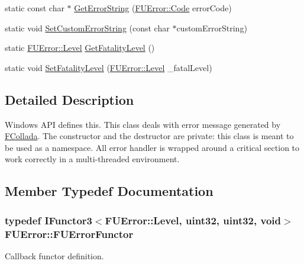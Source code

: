 \begin{DoxyCompactItemize}
\item 
static const char $\ast$ \hyperlink{classFUError_a234f541a90298631a0cf8180513aed3d}{GetErrorString} (\hyperlink{classFUError_adb409c35dc05786e6742818fc7643d7d}{FUError::Code} errorCode)
\item 
static void \hyperlink{classFUError_a4a3b8a2c8f75bcdc5fcbc064386bab6c}{SetCustomErrorString} (const char $\ast$customErrorString)
\item 
static \hyperlink{classFUError_ac4b066f99c221e180ecfe9183fabbf3c}{FUError::Level} \hyperlink{classFUError_a2362a05e0d3722c056cef1409712aa0a}{GetFatalityLevel} ()
\item 
static void \hyperlink{classFUError_a4fba4a813a0a10357f4415fb38bfd8d5}{SetFatalityLevel} (\hyperlink{classFUError_ac4b066f99c221e180ecfe9183fabbf3c}{FUError::Level} \_\-fatalLevel)
\end{DoxyCompactItemize}


\subsection{Detailed Description}
Windows API defines this. This class deals with error message generated by \hyperlink{namespaceFCollada}{FCollada}. The constructor and the destructor are private: this class is meant to be used as a namespace. All error handler is wrapped around a critical section to work correctly in a multi-\/threaded environment. 

\subsection{Member Typedef Documentation}
\hypertarget{classFUError_af681c10c56bca8c0ca09d2a996a85b4b}{
\subsubsection[{FUErrorFunctor}]{\setlength{\rightskip}{0pt plus 5cm}typedef {\bf IFunctor3}$<${\bf FUError::Level}, uint32, uint32, void$>$ {\bf FUError::FUErrorFunctor}}}
\label{classFUError_af681c10c56bca8c0ca09d2a996a85b4b}
Callback functor definition. 

